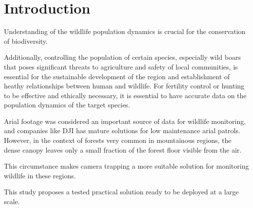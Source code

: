 \section{Introduction}

Understanding of the wildlife population dynamics is crucial for the conservation of biodiversity. 

Additionally, controlling the population of certain species, especially wild boars that poses significant threats to agriculture and safety of local communities\cite{croftTooManyWild2020,quiros-fernandezHuntersServingEcosystem2017}, is essential for the sustainable development of the region and establishment of heathy relationships between human and wildlife\cite{masseiFertilityControlMitigate2014}. For fertility control or hunting to be effective and ethically necessary, it is essential to have accurate data on the population dynamics of the target species.

Arial footage was considered an important source of data for wildlife monitoring, and companies like DJI has mature solutions for low maintenance arial patrols. However, in the context of forests very common in mountainous regions, the dense canopy leaves only a small fraction of the forest floor visible from the air. 

This circumstance makes camera trapping a more suitable solution for monitoring wildlife in these regions. 

This study proposes a tested practical solution ready to be deployed at a large scale.

